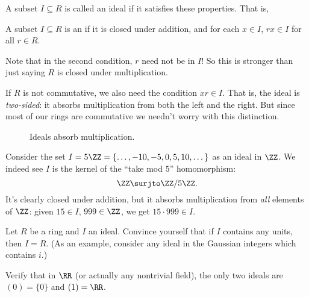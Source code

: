 A subset $I \subseteq R$ is called an ideal if it satisfies these properties.
That is,
\begin{definition}
	A subset $I \subseteq R$ is an 
	if it is closed under addition, and for each $x \in I$,
	$rx \in I$ for all $r \in R$.
\end{definition}
Note that in the second condition, $r$ need not be in $I$!
So this is stronger than just saying $R$ is closed under multiplication.
\begin{remark}
	If $R$ is not commutative, we also need the condition $xr \in I$.
	That is, the ideal is \emph{two-sided}: it absorbs multiplication
	from both the left and the right.
	But since most of our rings are commutative we needn't worry with this distinction.
\end{remark}

\begin{figure}[ht]
	\centering
	\caption{Ideals absorb multiplication.}
\end{figure}

\begin{example}
	Consider the set $I = 5\ZZ = \{\dots,-10,-5,0,5,10,\dots\}$ as an ideal in $\ZZ$.
	We indeed see $I$ is the kernel of the ``take mod $5$'' homomorphism:
	\[ \ZZ \surjto \ZZ/5\ZZ. \]
	It's clearly closed under addition,
	but it absorbs multiplication from \emph{all} elements of $\ZZ$:
	given $15 \in I$, $999 \in \ZZ$, we get $15 \cdot 999 \in I$.
\end{example}

\begin{ques}
	Let $R$ be a ring and $I$ an ideal.
	Convince yourself that if $I$ contains any units, then $I = R$.
	(As an example, consider any ideal in the Gaussian integers
	which contains $i$.)
\end{ques}
\begin{ques}
	Verify that in $\RR$ (or actually any nontrivial field),
	the only two ideals are $(0) = \{0\}$ and $(1) = \RR$.
\end{ques}

